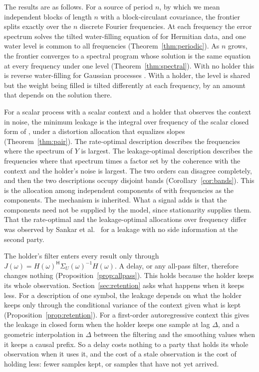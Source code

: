 \documentclass[11pt,onecolumn]{IEEEtran}
\newcommand{\herm}{\mathsf H}
\begin{document}
The results are as follows. For a source of period $n$, by which we
mean independent blocks of length $n$ with a block-circulant
covariance, the frontier splits exactly over the $n$ discrete Fourier
frequencies. At each frequency the error spectrum solves the tilted
water-filling equation of \cite{part1} for Hermitian data, and one water
level is common to all frequencies (Theorem~\ref{thm:periodic}). As $n$
grows, the frontier converges to a spectral program whose solution is
the same equation at every frequency under one level
(Theorem~\ref{thm:spectral}). With no holder this is reverse
water-filling for Gaussian processes \cite{kolmogorov1956,berger1971}.
With a holder, the level is shared but the weight being filled is
tilted differently at each frequency, by an amount that depends on the
solution there.

For a scalar process with a scalar context and a holder that observes
the context in noise, the minimum leakage is the integral over
frequency of the scalar closed form of \cite[Corollary~17]{part1},
under a distortion allocation that equalizes slopes
(Theorem~\ref{thm:pair}). The rate-optimal description describes the
frequencies where the spectrum of $Y$ is largest. The leakage-optimal
description describes the frequencies where that spectrum times a
factor set by the coherence with the context and the holder's noise is
largest. The two orders can disagree completely, and then the two
descriptions occupy disjoint bands (Corollary~\ref{cor:bands}). This is
the allocation among independent components of
\cite[Theorem~27]{part1} with frequencies as the components. The
mechanism is inherited. What a signal adds is that the components need
not be supplied by the model, since stationarity supplies them. That
the rate-optimal and the leakage-optimal allocations over frequency
differ was observed by Sankar et al.\ \cite{sankar2013} for a leakage
with no side information at the second party.

The holder's filter enters every result only through
$J(\omega)=H(\omega)^{\herm}\Sigma_U(\omega)^{-1}H(\omega)$. A delay, or
any all-pass filter, therefore changes nothing
(Proposition~\ref{prop:allpass}). This holds because the holder keeps
its whole observation. Section~\ref{sec:retention} asks what happens
when it keeps less. For a description of one symbol, the leakage
depends on what the holder keeps only through the conditional variance
of the context given what is kept (Proposition~\ref{prop:retention}).
For a first-order autoregressive context this gives the leakage in
closed form when the holder keeps one sample at lag $\Delta$, and a
geometric interpolation in $\Delta$ between the filtering and the
smoothing values when it keeps a causal prefix. So a delay costs
nothing to a party that holds its whole observation when it uses it,
and the cost of a stale observation is the cost of holding less: fewer
samples kept, or samples that have not yet arrived.
\end{document}
